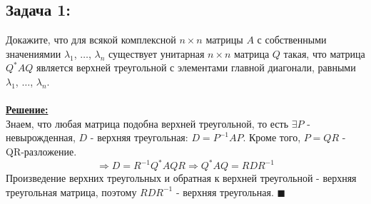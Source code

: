 \documentclass[a4paper,12pt,titlepage,final]{article}
\begin{document}
\subsection*{Задача 1:}
\noindent Докажите, что для всякой комплексной $n \times n$ матрицы $A$ с собственными значениямии $\lambda_1$, $\ldots$, $\lambda_n$ существует унитарная $n \times n$ матрица $Q$ такая, что матрица $Q^*AQ$ является верхней треугольной с элементами главной диагонали, равными $\lambda_1$, $\ldots$, $\lambda_n$.\\ \\
\textbf{\underline{Решение:}} \\
Знаем, что любая матрица подобна верхней треугольной, то есть $\exists P$ - невырожденная, $D$ - верхняя треугольная: $D = P^{-1}AP$. Кроме того, $P = QR$ - QR-разложение.
$$\Rightarrow D = R^{-1}Q^*AQR \Rightarrow Q^*AQ = RDR^{-1}$$
Произведение верхних треугольных и обратная к верхней треугольной - верхняя треугольная матрица, поэтому $RDR^{-1}$ - верхняя треугольная. $\blacksquare$ \\ \\ \\

\end{document}
